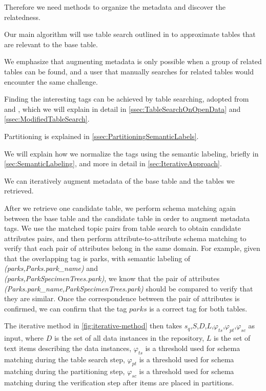 Therefore we need methods to organize the metadata and discover the relatedness.

Our main algorithm will use table search outlined in \cite{Mudgal2018Deep} to approximate tables that are relevant to the base table.

We emphasize that augmenting metadata is only possible when a group of related tables can be found, and a user that manually searches for related tables would encounter the same challenge.

Finding the interesting tags can be achieved by table searching, adopted from \cite{Nargesian2018Table} and \cite{conf/esws/EllefiBDT16}, which we will explain in detail in \autoref{ssec:TableSearchOnOpenData} and \autoref{ssec:ModifiedTableSearch}.

Partitioning is explained in \autoref{ssec:PartitioningSemanticLabels}.

We will explain how we normalize the tags using the semantic labeling, briefly in \autoref{sec:SemanticLabeling}, and more in detail in \autoref{sec:IterativeApproach}.

We can iteratively augment metadata of the base table and the tables we retrieved.

After we retrieve one candidate table, we perform schema matching again between the base table and the candidate table in order to augment metadata tags. We use the matched topic pairs from table search to obtain candidate attributes pairs, and then perform attribute-to-attribute schema matching to verify that each pair of attributes belong in the same domain. For example, given that the overlapping tag is parks, with semantic labeling of \textit{(parks,Parks.park\_name)} and \\ \textit{(parks,ParkSpecimenTrees.park)}, we know that the pair of attributes \textit{(Parks.park\_name,ParkSpecimenTrees.park)} should be compared to verify that they are similar. Once the correspondence between the pair of attributes is confirmed, we can confirm that the tag $parks$ is a correct tag for both tables.

The iterative method in \autoref{fig:iterative-method} then takes $s_q$,$S$,$D$,$L$,$\ensuremath{\varphi}_{ts}$,$\ensuremath{\varphi}_{pt}$,$\ensuremath{\varphi}_{sc}$ as input, where $D$ is the set of all data instances in the repository, $L$ is the set of text items describing the data instances, $\ensuremath{\varphi}_{ts}$ is a threshold used for schema matching during the table search step, $\ensuremath{\varphi}_{pt}$ is a threshold used for schema matching during the partitioning step, $\ensuremath{\varphi}_{sc}$ is a threshold used for schema matching during the verification step after items are placed in partitions.

